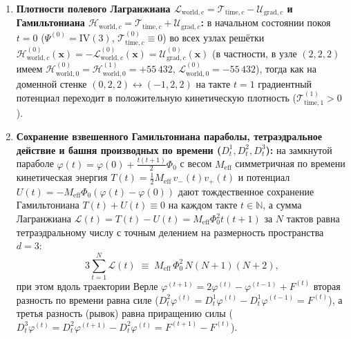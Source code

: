 \begin{theorem}
\begin{enumerate}[label=\textbf{(\arabic*)},leftmargin=*]
\begin{equation}
    \mathcal{U}_{\mathrm{grad},c}\bigl(\Psi^{(t)}\bigr)(\mathbf{x}) + D_{\mathrm{raw},c}\bigl(\Psi^{(t)}\bigr)(\mathbf{x})
    \;\equiv\;
    128\,M(\mathbf{x})\bigl(\Sigma_\mu(\mathbf{x}) + M(\mathbf{x})\bigr) + 8\,192
    \;=\; \mathrm{const}(t).
  \end{equation}
\item \textbf{Плотности полевого Лагранжиана $\mathcal{L}_{\mathrm{world},c} = \mathcal{T}_{\mathrm{time},c} - \mathcal{U}_{\mathrm{grad},c}$ и Гамильтониана $\mathcal{H}_{\mathrm{world},c} = \mathcal{T}_{\mathrm{time},c} + \mathcal{U}_{\mathrm{grad},c}$:}
  в начальном состоянии покоя $t = 0$ ($\Psi^{(0)} = \mathrm{IV}(3)$, $\mathcal{T}_{\mathrm{time},c}^{(0)} \equiv 0$) во всех узлах решётки $\mathcal{H}_{\mathrm{world},c}^{(0)}(\mathbf{x}) = -\mathcal{L}_{\mathrm{world},c}^{(0)}(\mathbf{x}) = \mathcal{U}_{\mathrm{grad},c}^{(0)}(\mathbf{x})$ (в частности, в узле $(2,2,2)$ имеем $\mathcal{H}_{\mathrm{world},0}^{(0)} = \mathcal{H}_{\mathrm{world},0}^{(1)} = +55\,432$, $\mathcal{L}_{\mathrm{world},0}^{(0)} = -55\,432$), тогда как на доменной стенке $(0,2,2) \leftrightarrow (-1,2,2)$ на такте $t = 1$ градиентный потенциал переходит в положительную кинетическую плотность ($\mathcal{T}_{\mathrm{time},1}^{(1)} > 0$).
\item \textbf{Сохранение взвешенного Гамильтониана параболы, тетраэдральное действие и башня производных по времени ($D_t^1, D_t^2, D_t^3$):}
  на замкнутой параболе $\varphi(t) = \varphi(0) + \frac{t(t+1)}{2}\Phi_0$ с весом $M_{\mathrm{eff}}$ симметричная по времени кинетическая энергия $T(t) = \frac{1}{2}M_{\mathrm{eff}}\,v_{-}(t)v_{+}(t)$ и потенциал $U(t) = -M_{\mathrm{eff}}\Phi_0(\varphi(t)-\varphi(0))$ дают тождественное сохранение Гамильтониана $T(t) + U(t) \equiv 0$ на каждом такте $t \in \mathbb{N}$, а сумма Лагранжиана $\mathcal{L}(t) = T(t) - U(t) = M_{\mathrm{eff}}\Phi_0^2 t(t+1)$ за $N$ тактов равна тетраэдральному числу с точным делением на размерность пространства $d = 3$:
  \begin{equation}
    \label{eq:mono-tetrahedral-action}
    3 \sum_{t=1}^{N} \mathcal{L}(t) \;\equiv\; M_{\mathrm{eff}}\,\Phi_0^2\,N(N+1)(N+2),
  \end{equation}
  при этом вдоль траектории Верле $\varphi^{(t+1)} = 2\varphi^{(t)} - \varphi^{(t-1)} + F^{(t)}$ вторая разность по времени равна силе ($D_t^2\varphi^{(t)} = D_t^1\varphi^{(t)} - D_t^1\varphi^{(t-1)} = F^{(t)}$), а третья разность (рывок) равна приращению силы ($D_t^3\varphi^{(t)} = D_t^2\varphi^{(t+1)} - D_t^2\varphi^{(t)} = F^{(t+1)} - F^{(t)}$).
\end{enumerate}
\end{theorem}

